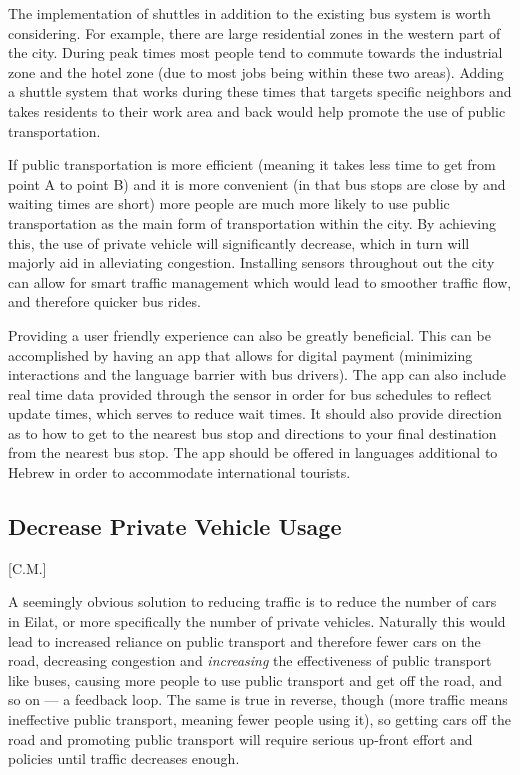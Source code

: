 \documentclass[12pt]{article}                       %
\begin{document}
The implementation of shuttles in addition to the existing bus system is worth considering. For example, there are large residential zones in the western part of the city. During peak times most people tend to commute towards the industrial zone and the hotel zone (due to most jobs being within these two areas). Adding a shuttle system that works during these times that targets specific neighbors and takes residents to their work area and back would help promote the use of public transportation.
    
If public transportation is more efficient (meaning it takes less time to get from point A to point B) and it is more convenient (in that bus stops are close by and waiting times are short) more people are much more likely to use public transportation as the main form of transportation within the city. By achieving this, the use of private vehicle will significantly decrease, which in turn will majorly aid in alleviating congestion. Installing sensors throughout out the city can allow for smart traffic management which would lead to smoother traffic flow, and therefore quicker bus rides.

Providing a user friendly experience can also be greatly beneficial. This can be accomplished by having an app that allows for digital payment (minimizing interactions and the language barrier with bus drivers). The app can also include real time data provided through the sensor in order for bus schedules to reflect update times, which serves to reduce wait times. It should also provide direction as to how to get to the nearest bus stop and directions to your final destination from the nearest bus stop. The app should be offered in languages additional to Hebrew in order to accommodate international tourists. 

\subsection{Decrease Private Vehicle Usage}[C.M.]

A seemingly obvious solution to reducing traffic is to reduce the number of cars in Eilat, or more specifically the number of private vehicles. Naturally this would lead to increased reliance on public transport and therefore fewer cars on the road, decreasing congestion and \textit{increasing} the effectiveness of public transport like buses, causing more people to use public transport and get off the road, and so on --- a feedback loop. The same is true in reverse, though (more traffic means ineffective public transport, meaning fewer people using it), so getting cars off the road and promoting public transport will require serious up-front effort and policies until traffic decreases enough.
\end{document}
